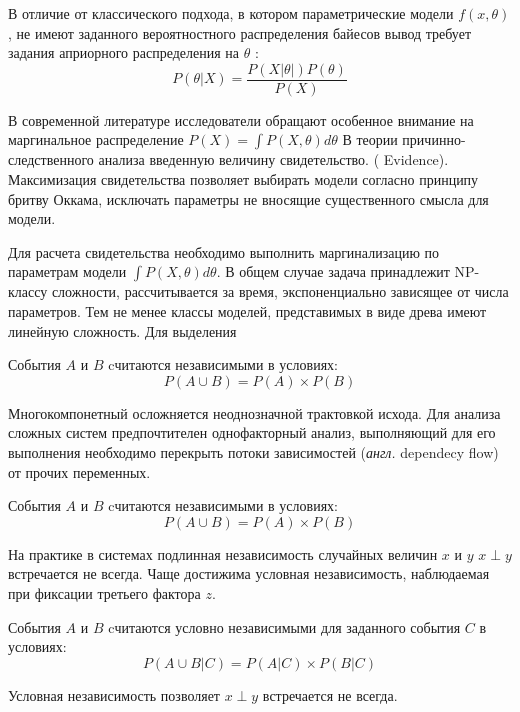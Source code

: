 В отличие от классического подхода, в котором
параметрические модели $f(x,\theta)$, не имеют заданного
вероятностного распределения байесов вывод
требует задания априорного распределения на $\theta$ :
\begin{equation}
    P(\theta | X) = \frac{P(X| \theta|) P(\theta)}{P(X)}
\end{equation}

В современной литературе 
исследователи обращают особенное внимание 
на маргинальное распределение $P(X) = \int P(X, \theta) d\theta$
В теории причинно-следственного анализа введенную величину
свидетельство. ( Evidence). Максимизация свидетельства
позволяет выбирать модели согласно принципу бритву Оккама, исключать
параметры не вносящие существенного смысла для модели.

Для расчета свидетельства необходимо выполнить маргинализацию по параметрам
модели $\int P(X, \theta) d\theta$. В общем случае задача принадлежит 
NP-классу сложности, рассчитывается за время, экспоненциально зависящее
от числа параметров. Тем не менее классы моделей, представимых в виде
древа имеют линейную сложность. Для выделения 


 События $A$ и $B$ cчитаются независимыми в условиях:
\begin{equation}
    P(A \cup B) = P(A) \times P(B)
\end{equation}

Многокомпонетный осложняется неоднозначной трактовкой исхода. 
Для анализа сложных систем предпочтителен однофакторный анализ, выполняющий
для его выполнения необходимо перекрыть потоки зависимостей (\textit{англ.} dependecy flow) от
прочих переменных.


 События $A$ и $B$ cчитаются независимыми в условиях:
\begin{equation}
    P(A \cup B) = P(A) \times P(B)
\end{equation}

На практике в системах подлинная независимость случайных величин $x$ и $y$
$x \perp y$ встречается не всегда. 
Чаще достижима условная независимость, наблюдаемая при
фиксации третьего фактора $z$.

 События $A$ и $B$ cчитаются условно независимыми 
для заданного события $C$ в условиях:
\begin{equation}
    P(A \cup B |C) = P(A|C) \times P(B|C)
\end{equation}

Условная независимость позволяет 
$x \perp y$ встречается не всегда.

